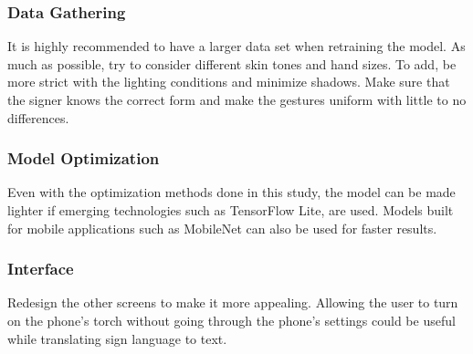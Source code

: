 \documentclass[journal]{./IEEE/IEEEtran}
\begin{document}
\subsubsection{Data Gathering}
It is highly recommended to have a larger data set when retraining the model. As much as possible, try to consider different skin tones and hand sizes. To add, be more strict with the lighting conditions and minimize shadows. Make sure that the signer knows the correct form and make the gestures uniform with little to no differences.
\newline
\subsubsection{Model Optimization}
Even with the optimization methods done in this study, the model can be made lighter if emerging technologies such as TensorFlow Lite, are used. Models built for mobile applications such as MobileNet can also be used for faster results.
\newline
\subsubsection{Interface}
Redesign the other screens to make it more appealing. Allowing the user to turn on the phone's torch without going through the phone's settings could be useful while translating sign language to text.



\end{document}
